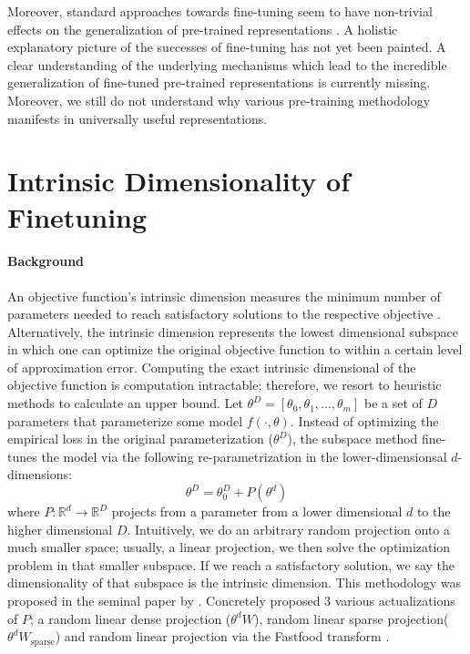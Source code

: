 \documentclass{article} %
\begin{document}
Moreover, standard approaches towards fine-tuning seem to have non-trivial effects on the generalization of pre-trained representations \citep{RXF}. A holistic explanatory picture of the successes of fine-tuning has not yet been painted. A clear understanding of the underlying mechanisms which lead to the incredible generalization of fine-tuned pre-trained representations is currently missing. Moreover, we still do not understand why various pre-training methodology manifests in universally useful representations.



\section{Intrinsic Dimensionality of Finetuning}

\paragraph{Background}
An objective function's intrinsic dimension measures the minimum number of parameters needed to reach satisfactory solutions to the respective objective \citep{intrinsic_dimension}. Alternatively, the intrinsic dimension represents the lowest dimensional subspace in which one can optimize the original objective function to within a certain level of approximation error. Computing the exact intrinsic dimensional of the objective function is computation intractable; therefore, we resort to heuristic methods to calculate an upper bound.
Let $\theta^{D}=\left[\theta_0, \theta_1,..., \theta_m\right]$ be a set of $D$ parameters that parameterize some model $f(\cdot, \theta)$. Instead of optimizing the empirical loss in the original parameterization ($\theta^{D}$), the subspace method fine-tunes the model via the following re-parametrization in the lower-dimensionsal $d$-dimensions:
\begin{equation}
    \theta^{D} = \theta^{D}_0 + P(\theta^{d})
    \label{eq:subspace_def}
\end{equation}
where $P: \mathbb{R}^d \rightarrow \mathbb{R}^D$ projects from a parameter from a lower dimensional $d$ to the higher dimensional $D$. Intuitively, we do an arbitrary random projection onto a much smaller space; usually, a linear projection, we then solve the optimization problem in that smaller subspace. If we reach a satisfactory solution, we say the dimensionality of that subspace is the intrinsic dimension. This methodology was proposed in the seminal paper by \cite{intrinsic_dimension}. Concretely \cite{intrinsic_dimension} proposed 3 various actualizations of $P$; a random linear dense projection ($\theta^{d}W$), random linear sparse projection($\theta^{d}W_{\text{sparse}}$) and random linear projection via the Fastfood transform \citep{fastfood}.
\end{document}
